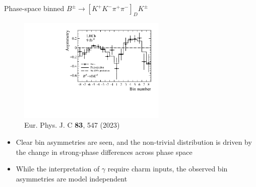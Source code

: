 \documentclass[dvipsnames]{beamer}
\begin{document}
\begin{frame}{Phase-space binned $B^\pm\to[K^+K^-\pi^+\pi^-]_DK^\pm$}
  \begin{figure}
    \includegraphics[height = 5cm]{Plots/BinAsymmetries_dk.pdf}
    \vspace{-0.4cm}
    \caption*{\tiny Eur. Phys. J. C \textbf{83}, 547 (2023)}
  \end{figure}
  \vspace{-0.5cm}
  \begin{itemize}
    \setlength\itemsep{0.5em}
    \item{Clear bin asymmetries are seen, and the non-trivial distribution is driven by the change in strong-phase differences across phase space}
    \item{While the interpretation of $\gamma$ require charm inputs, the observed bin asymmetries are model independent}
  \end{itemize}
\end{frame}
\end{document}
